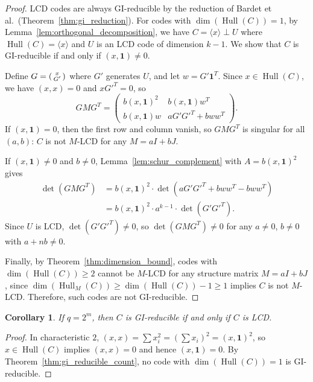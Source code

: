 \documentclass[11pt]{article}
\newcommand{\0}{\mathbf{0}}
\newcommand{\1}{\mathbf{1}}
\DeclareMathOperator{\Hull}{Hull}
\theoremstyle{plain}
\newtheorem{corollary}[theorem]{Corollary}
\theoremstyle{definition}
\theoremstyle{remark}
\begin{document}
\begin{proof}
LCD codes are always GI-reducible by the reduction of Bardet et al.\ (Theorem~\ref{thm:gi_reduction}). For codes with $\dim(\Hull(C)) = 1$, by Lemma~\ref{lem:orthogonal_decomposition}, we have $C = \langle x \rangle \perp U$ where $\Hull(C) = \langle x \rangle$ and $U$ is an LCD code of dimension $k-1$. We show that $C$ is GI-reducible if and only if $(x,\1) \neq 0$.

Define $G = \begin{psmallmatrix} x \\ G' \end{psmallmatrix}$ where $G'$ generates $U$, and let $w = G'\1^T$. Since $x \in \Hull(C)$, we have $(x,x) = 0$ and $xG'^T = 0$, so
\[
GMG^T = \begin{pmatrix} b(x,\1)^2 & b(x,\1) w^T \\ b(x,\1) w & aG'G'^T + bww^T \end{pmatrix}.
\]
If $(x,\1) = 0$, then the first row and column vanish, so $GMG^T$ is singular for all $(a,b)$: $C$ is not $M$-LCD for any $M = aI + bJ$.

If $(x,\1) \neq 0$ and $b \neq 0$, Lemma~\ref{lem:schur_complement} with $A = b(x,\1)^2$ gives
\begin{align*}
    \det(GMG^T)
    &= b(x,\1)^2 \cdot \det(aG'G'^T + bww^T - bww^T)\\
    &= b(x,\1)^2 \cdot a^{k-1} \cdot \det(G'G'^T).
\end{align*}
Since $U$ is LCD, $\det(G'G'^T) \neq 0$, so $\det(GMG^T) \neq 0$ for any $a \neq 0$, $b \neq 0$ with $a + nb \neq 0$.

Finally, by Theorem~\ref{thm:dimension_bound}, codes with $\dim(\Hull(C)) \geq 2$ cannot be $M$-LCD for any structure matrix $M = aI + bJ$, since $\dim(\Hull_M(C)) \geq \dim(\Hull(C)) - 1 \geq 1$ implies $C$ is not $M$-LCD. Therefore, such codes are not GI-reducible.
\end{proof}

\begin{corollary}\label{cor:char2}
If $q = 2^m$, then $C$ is GI-reducible if and only if $C$ is LCD.
\end{corollary}
\begin{proof}
In characteristic $2$, $(x,x) = \sum x_i^2 = (\sum x_i)^2 = (x,\1)^2$, so $x \in \Hull(C)$ implies $(x,x) = 0$ and hence $(x,\1) = 0$. By Theorem~\ref{thm:gi_reducible_count}, no code with $\dim(\Hull(C)) = 1$ is GI-reducible.
\end{proof}
\end{document}
